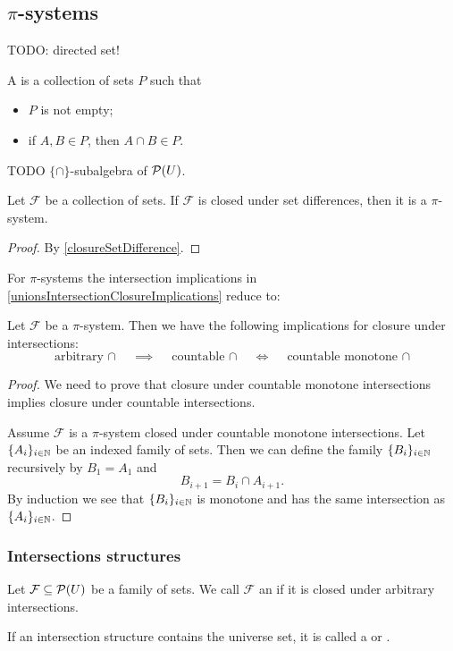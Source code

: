 \subsection{$\pi$-systems}
TODO: directed set!
\begin{definition}
A  is a collection of sets $P$ such that
\begin{itemize}
\item $P$ is not empty;
\item if $A,B\in P$, then $A\cap B\in P$.
\end{itemize}
\end{definition}

TODO $\{\cap\}$-subalgebra of $\operatorname{\mathcal{P}}(U)$.

\begin{lemma}
Let $\mathcal{F}$ be a collection of sets. If $\mathcal{F}$ is closed under set differences, then it is a $\pi$-system.
\end{lemma}
\begin{proof}
By \ref{closureSetDifference}.
\end{proof}

For $\pi$-systems the intersection implications in \ref{unionsIntersectionClosureImplications} reduce to:
\begin{lemma} \label{piSystemunionsIntersectionClosureImplications}
Let $\mathcal{F}$ be a $\pi$-system. Then we have the following implications for closure under intersections:
\[ \text{arbitrary $\cap$} \quad\implies\quad \text{countable $\cap$} \quad\iff\quad \text{countable monotone $\cap$} \]
\end{lemma}
\begin{proof}
We need to prove that closure under countable monotone intersections implies closure under countable intersections.

Assume $\mathcal{F}$ is a $\pi$-system closed under countable monotone intersections. Let $\{A_i\}_{i\in \mathbb{N}}$ be an indexed family of sets. Then we can define the family $\{B_i\}_{i\in \mathbb{N}}$ recursively by $B_1 = A_1$ and
\[ B_{i+1} = B_i \cap A_{i+1}. \]
By induction we see that $\{B_i\}_{i\in \mathbb{N}}$ is monotone and has the same intersection as $\{A_i\}_{i\in \mathbb{N}}$.
\end{proof}

\subsubsection{Intersections structures}
\begin{definition}
Let $\mathcal{F} \subseteq \operatorname{\mathcal{P}}(U)$ be a family of sets. We call $\mathcal{F}$ an  if it is closed under arbitrary intersections.

If an intersection structure contains the universe set, it is called a  or .
\end{definition}


